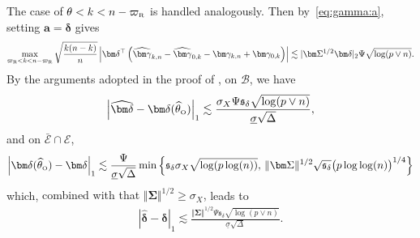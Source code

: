 \documentclass[11pt, a4paper]{article}
\newcommand{\mbf}{\mathbf}
\newcommand{\mc}{\mathcal}
\renewcommand{\l}{\left}
\renewcommand{\r}{\right}
\def\wh{\widehat}
\newcommand{\cp}{\theta}
\newcommand{\nn}{\nonumber}
\newcommand{\Oc}{\text{\tiny \upshape O}} %
\newcommand{\Rf}{\text{\tiny \upshape R}} %
\theoremstyle{definition}
\theoremstyle{definition}
\theoremstyle{definition}
\theoremstyle{definition}
\theoremstyle{definition}
\theoremstyle{remark}
\theoremstyle{definition}
\theoremstyle{definition}
\theoremstyle{definition}
\begin{document}
The case of $\cp < k < n - \varpi_{\Rf}$ is handled analogously.
Then by~\eqref{eq:gamma:a}, setting $\mbf a = \bm\delta$ gives
\begin{align}
\max_{\varpi_{\Rf} < k < n - \varpi_{\Rf}} \sqrt{\frac{k (n - k)}{n}} \l\vert \bm\delta^\top \l( \wh{\bm\gamma}_{k, n} - \wh{\bm\gamma}_{0, k} - \bm\gamma_{k, n} + \bm\gamma_{0, k} \r) \r\vert \lesssim \vert \bm\Sigma^{1/2} \bm\delta \vert_2 \Psi\sqrt{\log(p \vee n)}.
\nn
\end{align}
By the arguments adopted in the proof of , on $\mc B$, we have
\begin{align*}
\l\vert \wh{\bm\delta} - \bm\delta(\wh\cp_{\Oc}) \r\vert_1 \lesssim \frac{\sigma_X \Psi \mathfrak{s}_\delta \sqrt{\log(p \vee n)}}{\underline{\sigma} \sqrt{\Delta}},
\end{align*}
and on $\bar{\mc E} \cap \mc E$, 
\begin{align*}
\l\vert \bm\delta(\wh\cp_{\Oc}) - \bm\delta \r\vert_1 \lesssim \frac{ \Psi}{\underline{\sigma}\sqrt{\Delta}} \min\l\{ \mathfrak{s}_\delta \sigma_X \sqrt{\log(p\log(n))}, \, { \Vert \bm\Sigma \Vert^{1/2}} \sqrt{\mathfrak{s}_\delta} \bigl(p\log\log(n)\bigr)^{1/4} \r\}
\end{align*}
which, { combined with that $\Vert \bm\Sigma \Vert^{1/2} \ge \sigma_X$,} leads to
\begin{align}
\label{eq:lope:lone}
\l\vert \wh{\bm\delta} - \bm\delta \r\vert_1 \lesssim \frac{\Vert \bm\Sigma \Vert^{1/2} \Psi \mathfrak{s}_\delta \sqrt{\log(p \vee n)}}{\underline{\sigma}\sqrt{\Delta}}.
\end{align}
\end{document}
